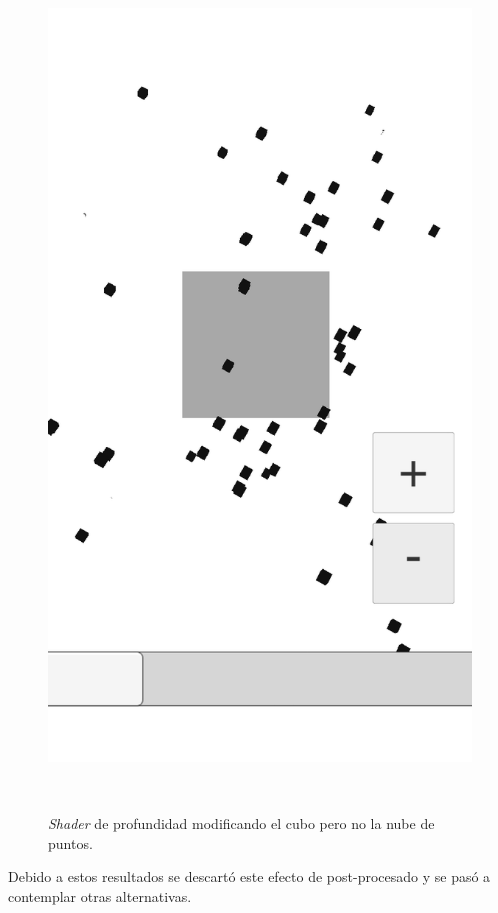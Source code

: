 \begin{figure}[H]
\begin{minipage}{0.5\textwidth}
    \end{minipage}
    \begin{minipage}{0.5\textwidth}
        \centering
        \includegraphics[scale=0.2]{Images/Shaders/profundidad (5).png}\\
    \end{minipage}\\
    \caption[\textit{Shader} de profundidad modificando el cubo pero no la nube de puntos]{\textit{Shader} de profundidad modificando el cubo pero no la nube de puntos.}
    \label{fig:shaderprofp2}
\end{figure}

Debido a estos resultados se descartó este efecto de post-procesado y se pasó a contemplar otras alternativas. 